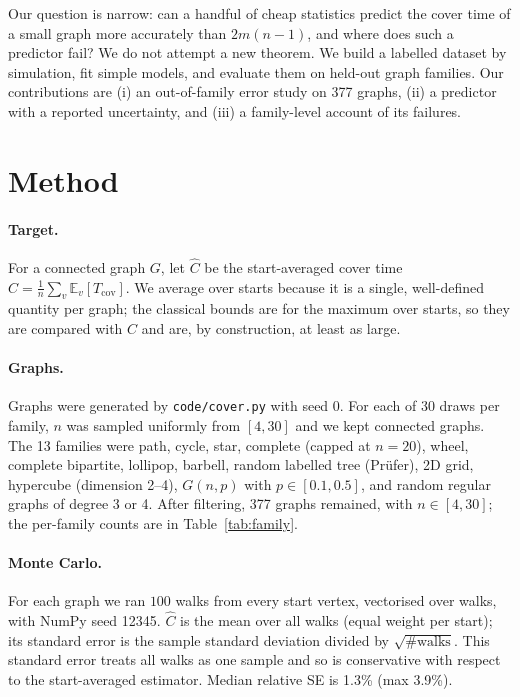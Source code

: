 \documentclass{article}
\begin{document}
Our question is narrow: can a handful of cheap statistics predict the cover time of a small graph more accurately than $2m(n-1)$, and where does such a predictor fail? We do not attempt a new theorem. We build a labelled dataset by simulation, fit simple models, and evaluate them on held-out graph families. Our contributions are (i) an out-of-family error study on 377 graphs, (ii) a predictor with a reported uncertainty, and (iii) a family-level account of its failures.

\section{Method}
\paragraph{Target.} For a connected graph $G$, let $\hat C$ be the start-averaged cover time $C = \frac1n\sum_v \mathbb E_v[T_{\mathrm{cov}}]$. We average over starts because it is a single, well-defined quantity per graph; the classical bounds are for the maximum over starts, so they are compared with $C$ and are, by construction, at least as large.

\paragraph{Graphs.} Graphs were generated by \texttt{code/cover.py} with seed 0. For each of 30 draws per family, $n$ was sampled uniformly from $[4,30]$ and we kept connected graphs. The 13 families were path, cycle, star, complete (capped at $n=20$), wheel, complete bipartite, lollipop, barbell, random labelled tree (Pr\"ufer), 2D grid, hypercube (dimension 2--4), $G(n,p)$ with $p\in[0.1,0.5]$, and random regular graphs of degree 3 or 4. After filtering, 377 graphs remained, with $n\in[4,30]$; the per-family counts are in Table~\ref{tab:family}.

\paragraph{Monte Carlo.} For each graph we ran $100$ walks from every start vertex, vectorised over walks, with NumPy seed 12345. $\hat C$ is the mean over all walks (equal weight per start); its standard error is the sample standard deviation divided by $\sqrt{\#\text{walks}}$. This standard error treats all walks as one sample and so is conservative with respect to the start-averaged estimator. Median relative SE is 1.3\% (max 3.9\%).
\end{document}
